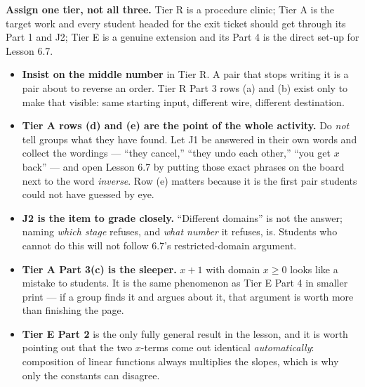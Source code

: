 \documentclass[10pt]{article}
\begin{document}
\begin{teachernote}
\small \textbf{Assign one tier, not all three.} Tier R is a procedure clinic; Tier A is the target
work and every student headed for the exit ticket should get through its Part 1 and J2; Tier E is a
genuine extension and its Part 4 is the direct set-up for Lesson 6.7.
\begin{itemize}[leftmargin=1.3em, nosep]
  \item \textbf{Insist on the middle number} in Tier R. A pair that stops writing it is a pair about
        to reverse an order. Tier R Part 3 rows (a) and (b) exist only to make that visible: same
        starting input, different wire, different destination.
  \item \textbf{Tier A rows (d) and (e) are the point of the whole activity.} Do \emph{not} tell
        groups what they have found. Let J1 be answered in their own words and collect the wordings
        --- ``they cancel,'' ``they undo each other,'' ``you get $x$ back'' --- and open Lesson 6.7
        by putting those exact phrases on the board next to the word \emph{inverse}. Row (e) matters
        because it is the first pair students could not have guessed by eye.
  \item \textbf{J2 is the item to grade closely.} ``Different domains'' is not the answer; naming
        \emph{which stage} refuses, and \emph{what number} it refuses, is. Students who cannot do
        this will not follow 6.7's restricted-domain argument.
  \item \textbf{Tier A Part 3(c) is the sleeper.} $x+1$ with domain $x\ge0$ looks like a mistake to
        students. It is the same phenomenon as Tier E Part 4 in smaller print --- if a group finds
        it and argues about it, that argument is worth more than finishing the page.
  \item \textbf{Tier E Part 2} is the only fully general result in the lesson, and it is worth
        pointing out that the two $x$-terms come out identical \emph{automatically}: composition of
        linear functions always multiplies the slopes, which is why only the constants can disagree.
\end{itemize}
\end{teachernote}
\end{document}

